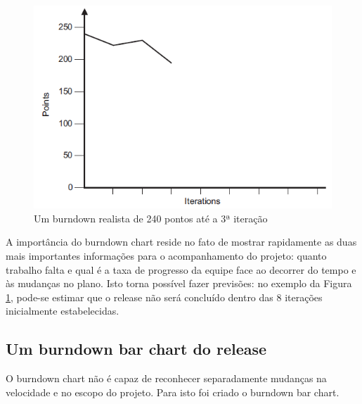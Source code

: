 \documentclass[a4paper,abntfigtabnum,noindentfirst]{abnt}
\begin{document}
\begin{figure}
  \caption{Um burndown realista de 240 pontos até a 3ª iteração}
  \label{burndown-real}
  \begin{center}
  \includegraphics[scale=0.6]{burndown-real}
  \end{center}
\end{figure}

A importância do burndown chart reside no fato de mostrar rapidamente as duas mais importantes informações para o acompanhamento do projeto: quanto trabalho falta e qual é a taxa de progresso da equipe face ao decorrer do tempo e às mudanças no plano. Isto torna possível fazer previsões: no exemplo da Figura \ref{burndown-real}, pode-se estimar que o release não será concluído dentro das 8 iterações inicialmente estabelecidas.


\subsection{Um burndown bar chart do release}

O burndown chart não é capaz de reconhecer separadamente mudanças na velocidade e no escopo do projeto. Para isto foi criado o burndown bar chart.
\end{document}

